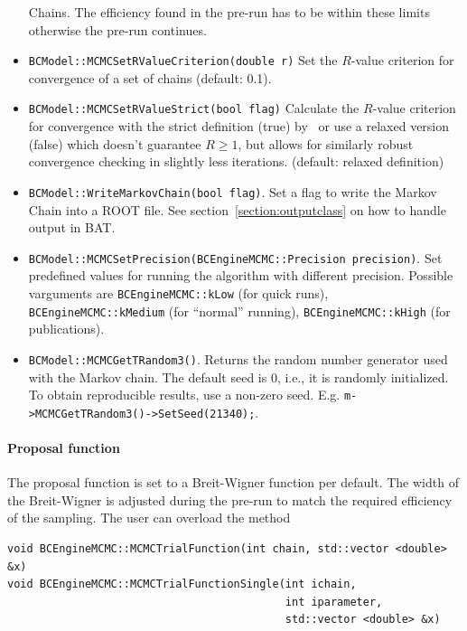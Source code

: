 \documentclass[11pt, a4paper]{article}
\begin{document}
\begin{itemize}
  Chains. The efficiency found in the pre-run has to be within these
  limits otherwise the pre-run continues.
\item \verb|BCModel::MCMCSetRValueCriterion(double r)| Set the
  $R$-value criterion for convergence of a set of chains (default:
  0.1).
\item \verb|BCModel::MCMCSetRValueStrict(bool flag)| Calculate the
  $R$-value criterion for convergence with the strict definition (true)
  by~\cite{R_value}  or use a relaxed version (false) which doesn't guarantee
  $R \ge 1$, but allows for similarly robust convergence checking in slightly
  less iterations. (default: relaxed definition)
\item \verb|BCModel::WriteMarkovChain(bool flag)|. Set a flag to
 write the Markov Chain into a ROOT file. See
 section~\ref{section:outputclass} on how to handle output in BAT.
\item
  \verb|BCModel::MCMCSetPrecision(BCEngineMCMC::Precision precision)|. Set
  predefined values for running the algorithm with different
  precision. Possible varguments are \linebreak \verb|BCEngineMCMC::kLow| (for
  quick runs), \verb|BCEngineMCMC::kMedium| (for ``normal'' running),
  \linebreak \verb|BCEngineMCMC::kHigh| (for publications).
\item \verb|BCModel::MCMCGetTRandom3()|. Returns the random number
generator used with the Markov chain. The default seed is 0, i.e.,
it is randomly initialized. To obtain reproducible results, use 
a non-zero seed. E.g.
\verb|m->MCMCGetTRandom3()->SetSeed(21340);|.
\end{itemize}

\paragraph{Proposal function}

The proposal function is set to a Breit-Wigner function per
default. The width of the Breit-Wigner is adjusted during the pre-run
to match the required efficiency of the sampling. The user can
overload the method
%
\begin{verbatim}
void BCEngineMCMC::MCMCTrialFunction(int chain, std::vector <double> &x)
void BCEngineMCMC::MCMCTrialFunctionSingle(int ichain,
                                           int iparameter,
                                           std::vector <double> &x)
\end{verbatim}
\end{document}

